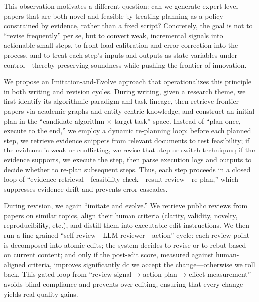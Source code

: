 \documentclass[manuscript,review,anonymous]{acmart}
\begin{document}
This observation motivates a different question: can we generate expert-level papers that are both novel and feasible by treating planning as a policy constrained by evidence, rather than a fixed script? Concretely, the goal is not to “revise frequently” per se, but to convert weak, incremental signals into actionable small steps, to front-load calibration and error correction into the process, and to treat each step’s inputs and outputs as state variables under control—thereby preserving soundness while pushing the frontier of innovation.

We propose an Imitation-and-Evolve approach that operationalizes this principle in both writing and revision cycles. During writing, given a research theme, we first identify its algorithmic paradigm and task lineage, then retrieve frontier papers via academic graphs and entity-centric knowledge, and construct an initial plan in the “candidate algorithm × target task” space. Instead of “plan once, execute to the end,” we employ a dynamic re-planning loop: before each planned step, we retrieve evidence snippets from relevant documents to test feasibility; if the evidence is weak or conflicting, we revise that step or switch techniques; if the evidence supports, we execute the step, then parse execution logs and outputs to decide whether to re-plan subsequent steps. Thus, each step proceeds in a closed loop of “evidence retrieval—feasibility check—result review—re-plan,” which suppresses evidence drift and prevents error cascades.

During revision, we again “imitate and evolve.” We retrieve public reviews from papers on similar topics, align their human criteria (clarity, validity, novelty, reproducibility, etc.), and distill them into executable edit instructions. We then run a fine-grained “self-review—LLM reviewer—action” cycle: each review point is decomposed into atomic edits; the system decides to revise or to rebut based on current content; and only if the post-edit score, measured against human-aligned criteria, improves significantly do we accept the change—otherwise we roll back. This gated loop from “review signal → action plan → effect measurement” avoids blind compliance and prevents over-editing, ensuring that every change yields real quality gains.
\end{document}
